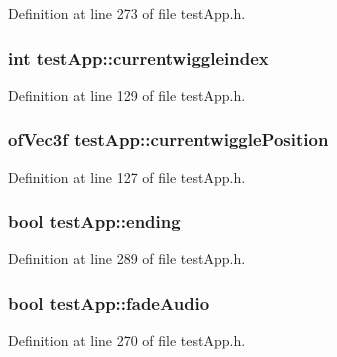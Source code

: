 Definition at line 273 of file test\-App.\-h.

\hypertarget{classtest_app_a6b9af0b1ae4a2c0530eb6a8cf8340751}{
\subsubsection[{currentwiggleindex}]{\setlength{\rightskip}{0pt plus 5cm}int test\-App\-::currentwiggleindex}}\label{classtest_app_a6b9af0b1ae4a2c0530eb6a8cf8340751}


Definition at line 129 of file test\-App.\-h.

\hypertarget{classtest_app_af81358868ae15faab1974ec074b1509f}{
\subsubsection[{currentwiggle\-Position}]{\setlength{\rightskip}{0pt plus 5cm}of\-Vec3f test\-App\-::currentwiggle\-Position}}\label{classtest_app_af81358868ae15faab1974ec074b1509f}


Definition at line 127 of file test\-App.\-h.

\hypertarget{classtest_app_acf09303bc452d2a38098f6bf94655408}{
\subsubsection[{ending}]{\setlength{\rightskip}{0pt plus 5cm}bool test\-App\-::ending}}\label{classtest_app_acf09303bc452d2a38098f6bf94655408}


Definition at line 289 of file test\-App.\-h.

\hypertarget{classtest_app_a918c09b5a4389a8402cfacb25d390226}{
\subsubsection[{fade\-Audio}]{\setlength{\rightskip}{0pt plus 5cm}bool test\-App\-::fade\-Audio}}\label{classtest_app_a918c09b5a4389a8402cfacb25d390226}


Definition at line 270 of file test\-App.\-h.

